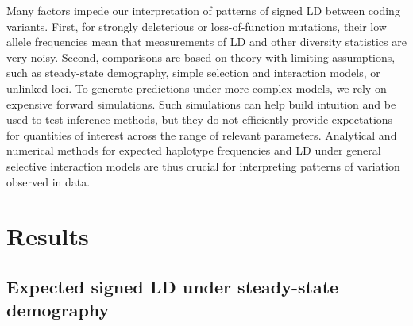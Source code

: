 \documentclass[]{article}
\begin{document}
Many factors impede our interpretation of patterns of signed LD between
coding variants. First, for strongly deleterious or loss-of-function mutations,
their low allele frequencies mean that measurements of LD and other diversity
statistics are very noisy. Second, comparisons are based on theory with
limiting assumptions, such as steady-state demography, simple selection and
interaction models, or unlinked loci. To generate predictions under more
complex models, we rely on expensive forward simulations. Such simulations can
help build intuition and be used to test inference methods, but they do not
efficiently provide expectations for quantities of interest across the range of
relevant parameters. Analytical and numerical methods for expected haplotype
frequencies and LD under general selective interaction models are thus crucial
for interpreting patterns of variation observed in data.

\section{Results}\label{sec:results}

\subsection{Expected signed LD under steady-state demography}
\label{sec:signed-ld}
\end{document}
